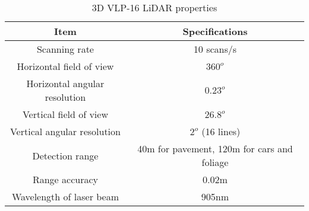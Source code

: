 \documentclass[a4paper, 12pt]{article}
\begin{document}
\begin{sloppypar}
\begin{table}[h!]
    \centering
    \begin{tabular}{||c|c||}
        \hline
        \rowcolor{lightgray}
        \textbf{Item}                 & \textbf{Specifications}                     \\ [0.5ex]
        \hline\hline
        Scanning rate                 & 10 scans/s                                  \\ \hline
        Horizontal field of view      & $360^o$                                     \\ \hline
        Horizontal angular resolution & $0.23^o$                                    \\ \hline
        Vertical field of view        & $26.8^o$                                    \\ \hline
        Vertical angular resolution   & $2^o$ (16 lines)                            \\ \hline
        Detection range               & 40m for pavement, 120m for cars and foliage \\ \hline
        Range accuracy                & 0.02m                                       \\ \hline
        Wavelength of laser beam      & 905nm                                       \\ [0.5ex]
        \hline
    \end{tabular}
    \caption{3D VLP-16 LiDAR properties \cite{vlp16}}
    \label{Chap4:Table1}
\end{table}






\end{sloppypar}
\end{document}
